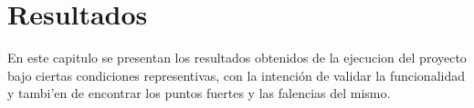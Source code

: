 \chapter{Resultados}

En este capitulo se presentan los resultados obtenidos de la ejecucion del proyecto bajo ciertas condiciones representivas, con la intención de validar la funcionalidad y tambi'en de encontrar los puntos fuertes y las falencias del mismo.


